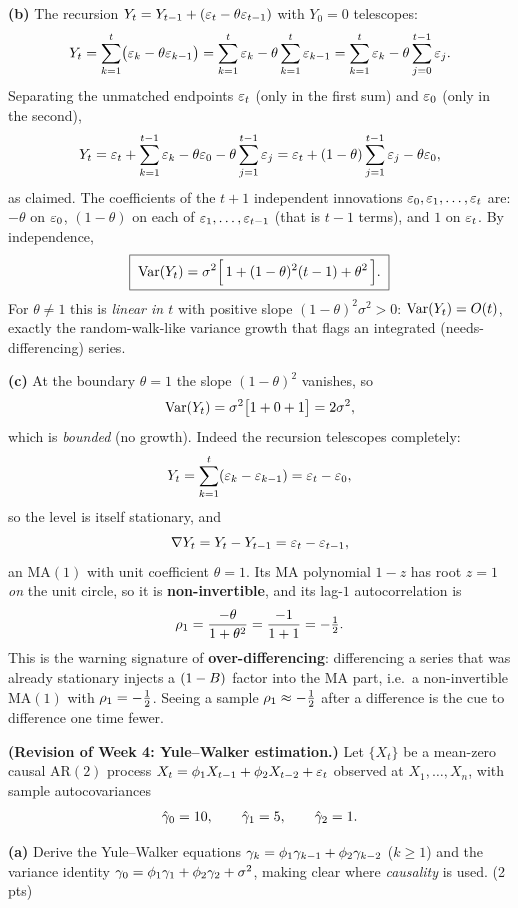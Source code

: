 \documentclass[11pt]{article}
\begin{document}
\textbf{(b)} The recursion $Y_t=Y_{t-1}+(\varepsilon_t-\theta\varepsilon_{t-1})$ with $Y_0=0$ telescopes:
\[
Y_t=\sum_{k=1}^{t}\bigl(\varepsilon_k-\theta\varepsilon_{k-1}\bigr)
=\sum_{k=1}^{t}\varepsilon_k-\theta\sum_{k=1}^{t}\varepsilon_{k-1}
=\sum_{k=1}^{t}\varepsilon_k-\theta\sum_{j=0}^{t-1}\varepsilon_j .
\]
Separating the unmatched endpoints $\varepsilon_t$ (only in the first sum) and $\varepsilon_0$ (only in the second),
\[
Y_t=\varepsilon_t+\sum_{k=1}^{t-1}\varepsilon_k-\theta\varepsilon_0-\theta\sum_{j=1}^{t-1}\varepsilon_j
=\varepsilon_t+(1-\theta)\sum_{j=1}^{t-1}\varepsilon_j-\theta\varepsilon_0 ,
\]
as claimed. The coefficients of the $t+1$ independent innovations $\varepsilon_0,\varepsilon_1,\dots,\varepsilon_t$ are: $-\theta$ on $\varepsilon_0$, $(1-\theta)$ on each of $\varepsilon_1,\dots,\varepsilon_{t-1}$ (that is $t-1$ terms), and $1$ on $\varepsilon_t$. By independence,
\[
\boxed{\;\operatorname{Var}(Y_t)=\sigma^{2}\Bigl[\,1+(1-\theta)^{2}(t-1)+\theta^{2}\,\Bigr].\;}
\]
For $\theta\neq1$ this is \emph{linear in $t$} with positive slope $(1-\theta)^{2}\sigma^{2}>0$: $\operatorname{Var}(Y_t)=O(t)$, exactly the random-walk-like variance growth that flags an integrated (needs-differencing) series.

\textbf{(c)} At the boundary $\theta=1$ the slope $(1-\theta)^{2}$ vanishes, so
\[
\operatorname{Var}(Y_t)=\sigma^{2}\bigl[1+0+1\bigr]=2\sigma^{2},
\]
which is \emph{bounded} (no growth). Indeed the recursion telescopes completely:
\[
Y_t=\sum_{k=1}^{t}(\varepsilon_k-\varepsilon_{k-1})=\varepsilon_t-\varepsilon_0 ,
\]
so the level is itself stationary, and
\[
\nabla Y_t=Y_t-Y_{t-1}=\varepsilon_t-\varepsilon_{t-1},
\]
an $\mathrm{MA}(1)$ with unit coefficient $\theta=1$. Its MA polynomial $1-z$ has root $z=1$ \emph{on} the unit circle, so it is \textbf{non-invertible}, and its lag-$1$ autocorrelation is
\[
\rho_1=\frac{-\theta}{1+\theta^{2}}=\frac{-1}{1+1}=-\tfrac12 .
\]
This is the warning signature of \textbf{over-differencing}: differencing a series that was already stationary injects a $(1-B)$ factor into the MA part, i.e.\ a non-invertible $\mathrm{MA}(1)$ with $\rho_1=-\tfrac12$. Seeing a sample $\rho_1\approx-\tfrac12$ after a difference is the cue to difference one time fewer.

\statementstart
\textbf{(Revision of Week 4: Yule--Walker estimation.)} Let $\{X_t\}$ be a mean-zero causal $\mathrm{AR}(2)$ process $X_t=\phi_1X_{t-1}+\phi_2X_{t-2}+\varepsilon_t$ observed at $X_1,\dots,X_n$, with sample autocovariances
\[
\hat{\gamma}_0=10,\qquad \hat{\gamma}_1=5,\qquad \hat{\gamma}_2=1 .
\]

\textbf{(a)} Derive the Yule--Walker equations $\gamma_k=\phi_1\gamma_{k-1}+\phi_2\gamma_{k-2}$ ($k\ge1$) and the variance identity $\gamma_0=\phi_1\gamma_1+\phi_2\gamma_2+\sigma^{2}$, making clear where \emph{causality} is used. \hfill(2 pts)
\end{document}
